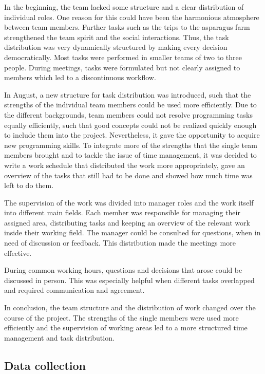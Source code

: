 \bigskip
In the beginning, the team lacked some structure and a clear distribution of individual roles. One reason for this could have been the harmonious atmosphere between team members. Further tasks such as the trips to the asparagus farm strengthened the team spirit and the social interactions. Thus, the task distribution was very dynamically structured by making every decision democratically. Most tasks were performed in smaller teams of two to three people. During meetings, tasks were formulated but not clearly assigned to members which led to a discontinuous workflow.

In August, a new structure for task distribution was introduced, such that the strengths of the individual team members could be used more efficiently. Due to the different backgrounds, team members could not resolve programming tasks equally efficiently, such that good concepts could not be realized quickly enough to include them into the project. Nevertheless, it gave the opportunity to acquire new programming skills. To integrate more of the strengths that the single team members brought and to tackle the issue of time management, it was decided to write a work schedule that distributed the work more appropriately, gave an overview of the tasks that still had to be done and showed how much time was left to do them.

The supervision of the work was divided into manager roles and the work itself into different main fields. Each member was responsible for managing their assigned area, distributing tasks and keeping an overview of the relevant work inside their working field. The manager could be consulted for questions, when in need of discussion or feedback. This distribution made the meetings more effective.

During common working hours, questions and decisions that arose could be discussed in person. This was especially helpful when different tasks overlapped and required communication and agreement.

\bigskip
In conclusion, the team structure and the distribution of work changed over the course of the project. The strengths of the single members were used more efficiently and the supervision of working areas led to a more structured time management and task distribution.


\subsection{Data collection}
\label{sec:DataCollection}

